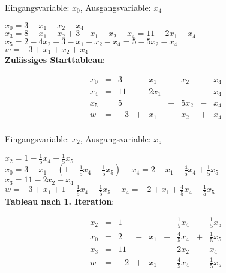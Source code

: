 \documentclass[a4paper,11pt]{article}
\begin{document}
\begin{enumerate}
\begin{enumerate}
        Eingangsvariable: $x_0$, Ausgangsvariable: $x_4$

        \( x_0 = 3 - x_1 - x_2 - x_4 \) \\[3pt]
        \( x_3 = 8 - x_1 + x_2 + 3 - x_1 - x_2 - x_4 = 11 - 2 x_1 - x_4 \) \\[3pt]
        \( x_5 = 2 - 4x_2 + 3 - x_1 - x_2 - x_4 = 5  - 5 x_2 - x_4 \) \\[3pt]
        \( w = -3 + x_1 + x_2 + x_4 \) \\[3pt]

        \textbf{Zulässiges Starttableau}:

        \[\begin{array}{rcrcrcrcr}
            x_0 & = & 3 & - & x_1 & - & x_2 & - & x_4 \\[3pt]
            x_4 & = & 11 & - & 2x_1 & & & - & x_4 \\[3pt]
            x_5 & = & 5 & & & - & 5x_2 & - & x_4 \\[3pt] \hline
              w & = & -3& + & x_1 & + & x_2 & + & x_4\\
        \end{array}\]

        Eingangsvariable: $x_2$, Ausgangsvariable: $x_5$

        \( x_2 = 1 - \frac{1}{5} x_4 - \frac{1}{5} x_5 \) \\[3pt]
        \( x_0 = 3 - x_1 - \left(1 - \frac{1}{5}x_4 - \frac{1}{5}x_5 \right) - x_4 =
            2 - x_1 - \frac{4}{5} x_4 + \frac{1}{5}x_5 \) \\[3pt]
        \( x_3 = 11 - 2x_2 - x_4 \) \\[3pt]
        \( w = -3 + x_1 + 1 - \frac{1}{5}x_4 - \frac{1}{5}x_5 + x_4 =
            - 2 + x_1 + \frac{4}{5}x_4 - \frac{1}{5}x_5 \) \\[3pt]

        \textbf{Tableau nach 1. Iteration}:

        \[\begin{array}{rcrcrcrcr}
            x_2 & = & 1 & - & & & \frac{1}{5} x_4 & - & \frac{1}{5} x_5 \\[3pt]
            x_0 & = & 2 & - & x_1 & - & \frac{4}{5} x_4 & + & \frac{1}{5} x_5 \\[3pt]
            x_3 & = & 11 & & & - & 2x_2 & - & x_4 \\[3pt] \hline
              w & = & -2 & + & x_1 & + & \frac{4}{5} x_4 & - & \frac{1}{5}x_5 \\[3pt]
        \end{array}\]


\end{enumerate}
\end{enumerate}
\end{document}
